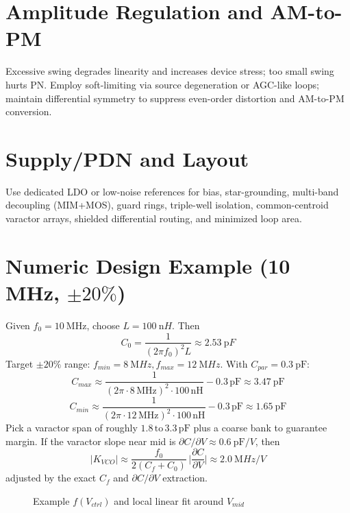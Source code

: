 \section{Amplitude Regulation and AM-to-PM}
Excessive swing degrades linearity and increases device stress; too small swing hurts PN. Employ soft-limiting via source degeneration or AGC-like loops; maintain differential symmetry to suppress even-order distortion and AM-to-PM conversion.

\section{Supply/PDN and Layout}
Use dedicated LDO or low-noise references for bias, star-grounding, multi-band decoupling (MIM+MOS), guard rings, triple-well isolation, common-centroid varactor arrays, shielded differential routing, and minimized loop area.

\section{Numeric Design Example (10 MHz, \(\pm20\%\))}
Given \(f_0=\SI{10}{\mega\hertz}\), choose \(L=\SI{100}{\nano H}\). Then
\[
 C_0 = \frac{1}{(2\pi f_0)^2 L} \approx \SI{2.53}{\pico F}
\]
Target \(\pm20\%\) range: \(f_{min}=\SI{8}{\mega Hz}, f_{max}=\SI{12}{\mega Hz}\). With \(C_{par}=\SI{0.3}{\pF}\):
\[
 C_{max} \approx \frac{1}{(2\pi\cdot 8\,\mathrm{MHz})^2 \cdot 100\,\mathrm{nH}} - 0.3\,\mathrm{pF} \approx \SI{3.47}{\pF}
\]
\[
 C_{min} \approx \frac{1}{(2\pi\cdot 12\,\mathrm{MHz})^2 \cdot 100\,\mathrm{nH}} - 0.3\,\mathrm{pF} \approx \SI{1.65}{\pF}
\]
Pick a varactor span of roughly \(1.8\,\text{to}\,3.3\,\mathrm{pF}\) plus a coarse bank to guarantee margin. If the varactor slope near mid is \(\partial C/\partial V \approx \SI{0.6}{\pF/V}\), then
\[
 |K_{VCO}| \approx \frac{f_0}{2(C_f+C_0)}\,\Big|\frac{\partial C}{\partial V}\Big| \approx \SI{2.0}{\mega Hz/V}
\]
adjusted by the exact \(C_f\) and $\partial C/\partial V$ extraction.

\begin{figure}[H]
  \centering
  \caption{Example $f(V_{ctrl})$ and local linear fit around $V_{mid}$}
\end{figure}

